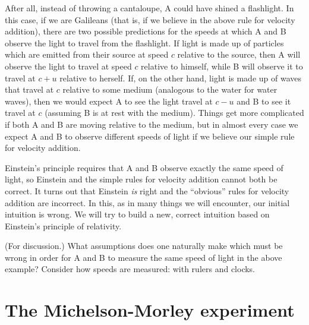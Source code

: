 After all, instead of throwing a cantaloupe, A could have shined a
flashlight.  In this case, if we are Galileans (that is, if we believe
in the above rule for velocity addition), there are two possible
predictions for the speeds at which A and B observe the light to
travel from the flashlight.  If light is made up of particles which
are emitted from their source at speed $c$ relative to the source,
then A will observe the light to travel at speed $c$ relative to
himself, while B will observe it to travel at $c+u$ relative to
herself.  If, on the other hand, light is made up of waves that travel
at $c$ relative to some medium (analogous to the water for water
waves), then we would expect A to see the light travel at $c-u$ and B
to see it travel at $c$ (assuming B is at rest with the medium).
Things get more complicated if both A and B are moving relative to the
medium, but in almost every case we expect A and B to observe
different speeds of light if we believe our simple rule for velocity
addition.

Einstein's principle requires that A and B observe exactly the same
speed of light, so Einstein and the simple rules for velocity addition
cannot both be correct.  It turns out that Einstein {\em is\/} right
and the ``obvious'' rules for velocity addition are incorrect.  In
this, as in many things we will encounter, our initial intuition is
wrong.  We will try to build a new, correct intuition based on
Einstein's principle of relativity.

\begin{problem}
(For discussion.)  What assumptions does one naturally make which must
be wrong in order for A and B to measure the same speed of light in
the above example?  Consider how speeds are measured: with rulers and
clocks.
\end{problem}


\section{The Michelson-Morley experiment}
\label{sec:mme}


